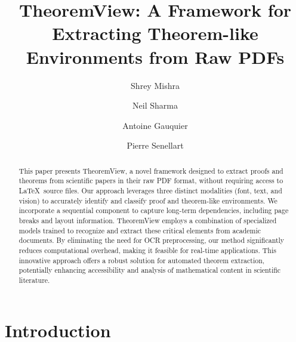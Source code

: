 \documentclass[runningheads]{llncs}
\begin{document}
%
\title{TheoremView: A Framework for Extracting Theorem-like Environments from Raw PDFs}
%
%
\author{Shrey Mishra \and
Neil Sharma \and
Antoine Gauquier \and
Pierre Senellart}



\maketitle              %
%
\begin{abstract}
This paper presents TheoremView, a novel framework designed 
to extract proofs and theorems from scientific papers in their raw PDF format, 
without requiring access to \LaTeX~source files. Our approach leverages three 
distinct modalities (font, text, and vision) to accurately identify and classify 
proof and theorem-like environments. We incorporate a sequential component to capture 
long-term dependencies, including page breaks and layout information. 
TheoremView employs a combination of specialized models trained to recognize 
and extract these critical elements from academic documents. By eliminating 
the need for OCR preprocessing, our method significantly reduces computational 
overhead, making it feasible for real-time applications. This innovative 
approach offers a robust solution for automated theorem extraction, potentially 
enhancing accessibility and analysis of mathematical content in scientific 
literature.

\end{abstract}
%
\section{Introduction}
\end{document}
